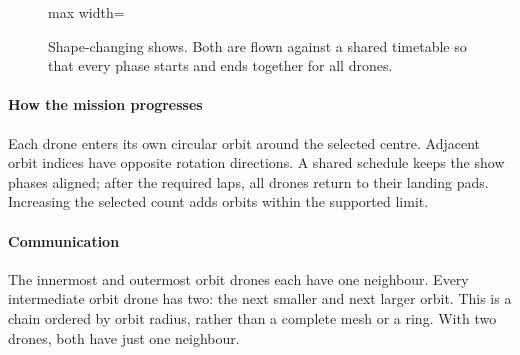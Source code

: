\documentclass[11pt,a4paper,oneside]{report}
\begin{document}
\begin{figure}[H]
\centering
\begin{adjustbox}{max width=\linewidth}
\end{adjustbox}
\caption[Star and planetary shows]{Shape-changing shows. Both are flown against a shared timetable so that every phase
starts and ends together for all drones.}
\label{fig:shows}
\end{figure}


\paragraph{How the mission progresses}
Each drone enters its own circular orbit around the selected centre. Adjacent orbit indices have opposite rotation directions. A shared schedule keeps the show phases aligned; after the required laps, all drones return to their landing pads. Increasing the selected count adds orbits within the supported limit.

\paragraph{Communication}
The innermost and outermost orbit drones each have one neighbour. Every intermediate orbit drone has two: the next smaller and next larger orbit. This is a chain ordered by orbit radius, rather than a complete mesh or a ring. With two drones, both have just one neighbour.
\end{document}
